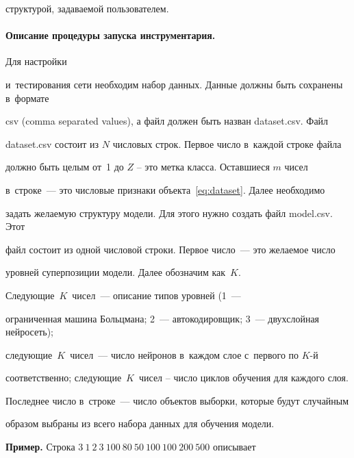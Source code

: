 структурой, задаваемой пользователем.





\vspace*{-12pt}





\paragraph*{Описание процедуры запуска инструментария.} Для настройки 


и~тестирования сети необходим набор данных. Данные должны быть сохранены в~формате 


csv (comma separated values), а файл должен быть назван dataset.csv. Файл 


dataset.csv состоит из $N$ числовых строк. Первое число в~каждой строке файла 


должно быть целым от~1 до $Z$ -- это метка класса. Оставшиеся $m$ чисел 


в~строке~--- это числовые признаки объекта~\eqref{eq:dataset}. Далее необходимо 


задать желаемую структуру модели. Для этого нужно создать файл model.csv. Этот 


файл состоит из одной числовой строки. Первое число~--- это желаемое число 


уровней суперпозиции модели. Далее обозначим как~$K$.


Следующие~$K$~чисел~--- описание типов уровней (1~--- 


ограниченная машина Больцмана; 2~--- автокодировщик; 3~--- двухслойная нейросеть); 


следующие~$K$~чисел~--- число нейронов в~каждом слое с~первого по $K$-й 


соответственно; следующие~$K$~чисел -- число циклов обучения для каждого слоя. 


Последнее число в~строке~--- число объектов выборки, которые будут случайным 


образом выбраны из всего набора данных для обучения модели. 





\smallskip





\noindent


\textbf{Пример.} Строка $3~1~2~3~100~80~50~100~100~200~500$ описывает 


